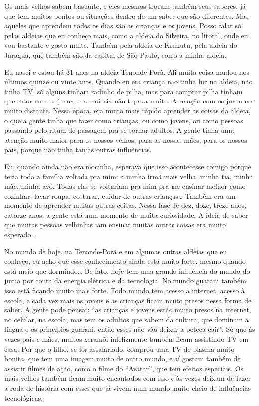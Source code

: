Os mais velhos sabem bastante, e eles mesmos trocam também seus saberes,
já que tem muitos pontos ou situações dentro de um saber que são
diferentes. Mas aqueles que aprendem todos os dias são as crianças e os
jovens. Posso falar só pelas aldeias que eu conheço mais, como a aldeia
do Silveira, no litoral, onde eu vou bastante e gosto muito. Também
pela aldeia de Krukutu, pela aldeia do Jaraguá, que também são da
capital de São Paulo, como a minha aldeia.

Eu nasci e estou há 31 anos na aldeia Tenonde Porã. Ali muita coisa
mudou nos últimos quinze ou vinte anos. Quando eu era criança não tinha
luz na aldeia, não tinha TV, só alguns tinham radinho de pilha, mas
para comprar pilha tinham que estar com os jurua, e a maioria não
topava muito. A relação com os jurua era muito distante. Nessa época,
era muito mais rápido aprender as coisas da aldeia, o que a gente tinha
que fazer como crianças, ou como jovens, ou como pessoas passando pelo
ritual de passagem pra se tornar adultos. A gente tinha uma atenção
muito maior para os nossos velhos, para as nossas mães, para os nossos
pais, porque não tinha tantas outras influências.

Eu, quando ainda não era mocinha, esperava que isso acontecesse comigo
porque teria toda a família voltada pra mim: a minha irmã mais velha,
minha tia, minha mãe, minha avó. Todas elas se voltariam pra mim pra me
ensinar melhor como cozinhar, lavar roupa, costurar, cuidar de outras
crianças\ldots{} Também era um momento de aprender muitas outras coisas.
Nessa fase de dez, doze, treze anos, catorze anos, a gente está num
momento de muita curiosidade. A ideia de saber que muitas pessoas
velhinhas iam ensinar muitas outras coisas era muito esperado.

No mundo de hoje, na Tenonde-Porã e em algumas outras aldeias que eu
conheço, eu acho que esse conhecimento ainda está muito forte, mesmo
quando está meio que dormindo\ldots{} De fato, hoje tem uma grande
influência do mundo do jurua por conta da energia elétrica e da
tecnologia. No mundo guarani também isso está ficando muito mais forte.
Todo mundo tem acesso à internet, acesso à escola, e cada vez mais os
jovens e as crianças ficam muito presos nessa forma de saber. A gente
pode pensar: ``as crianças e jovens estão muito presos na internet, no
celular, na escola, mas tem os adultos que sabem da cultura, que
dominam a língua e os princípios guarani, então esses não vão deixar a
peteca cair''. Só que às vezes pais e mães, muitos xeramõi infelizmente
também ficam assistindo TV em casa. Por que o filho, se for
assalariado, comprou uma TV de plasma muito bonita, que tem uma imagem
muito de outro mundo, e aí gostam também de assistir filmes de ação,
como o filme do ``Avatar'', que tem efeitos especiais. Os mais velhos
também ficam muito encantados com isso e às vezes deixam de fazer a
roda de história com esses que já vivem num mundo muito cheio de
influências tecnológicas. 

